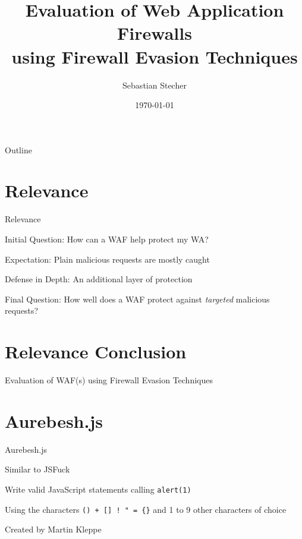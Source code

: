 \documentclass[aspectratio=169]{beamer}
\title[Evaluation of Web Application Firewalls using Firewall Evasion Techniques]{Evaluation of Web Application Firewalls \\ using Firewall Evasion Techniques}
\author{Sebastian Stecher}
\institute{HDBW Hochschule der Bayerischen Wirtschaft}
\date{\today}
\newcommand{\supertext}[1]{\fontsize{30}{40}\selectfont #1}
\begin{document}
\maketitle



\begin{frame}{Outline}
	\tableofcontents
\end{frame}

\section{Relevance}
\begin{frame}{Relevance}
	\begin{vfilleditems}
		\item<2-> Initial Question: How can a WAF help protect my WA?
		\item<3-> Expectation: Plain malicious requests are mostly caught
		\item<4-> Defense in Depth: An additional layer of protection
		\item<5-> Final Question: How well does a WAF protect against \textit{targeted} malicious requests?
	\end{vfilleditems}
\end{frame}

\section*{Relevance Conclusion}
\begin{frame}
	\centering
	\vfill
	\supertext{Evaluation of WAF(s) using Firewall Evasion Techniques}
	\vfill
\end{frame}

\section{Aurebesh.js}

\begin{frame}[fragile]{Aurebesh.js}
	\begin{vfilleditems}
		\item<2-> Similar to JSFuck \cite{mk/jsfuck}
		\item<3-> Write valid JavaScript statements calling \verb|alert(1)|
		\item<4-> Using the characters \verb|() + [] ! " = {}| and 1 to 9 other characters of choice
		\item<5-> Created by Martin Kleppe \cite{mk/aurebesh}
	\end{vfilleditems}
\end{frame}
\end{document}
